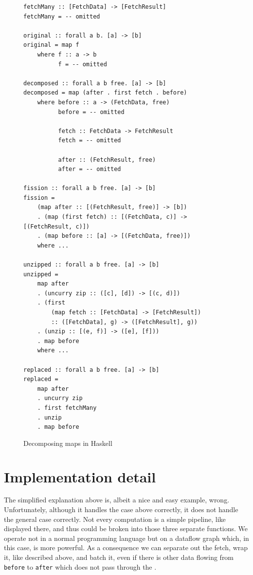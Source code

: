 \begin{figure}
\begin{verbatim}
fetchMany :: [FetchData] -> [FetchResult]
fetchMany = -- omitted

original :: forall a b. [a] -> [b]
original = map f
    where f :: a -> b
          f = -- omitted

decomposed :: forall a b free. [a] -> [b]
decomposed = map (after . first fetch . before)
    where before :: a -> (FetchData, free)
          before = -- omitted

          fetch :: FetchData -> FetchResult
          fetch = -- omitted

          after :: (FetchResult, free)
          after = -- omitted

fission :: forall a b free. [a] -> [b]
fission =
    (map after :: [(FetchResult, free)] -> [b])
    . (map (first fetch) :: [(FetchData, c)] -> [(FetchResult, c)])
    . (map before :: [a] -> [(FetchData, free)])
    where ...

unzipped :: forall a b free. [a] -> [b]
unzipped =
    map after
    . (uncurry zip :: ([c], [d]) -> [(c, d)])
    . (first
        (map fetch :: [FetchData] -> [FetchResult])
        :: ([FetchData], g) -> ([FetchResult], g))
    . (unzip :: [(e, f)] -> ([e], [f]))
    . map before
    where ...

replaced :: forall a b free. [a] -> [b]
replaced =
    map after
    . uncurry zip
    . first fetchMany
    . unzip
    . map before
\end{verbatim}
\caption{Decomposing maps in Haskell}
\label{fig:map-decomposition-in-code}
\end{figure}


\section{Implementation detail}

The simplified explanation above is, albeit a nice and easy example, wrong.
Unfortunately, although it handles the case above correctly, it does not handle the general case correctly.
Not every computation is a simple pipeline, like displayed there, and thus could be broken into those three separate functions.
We operate not in a normal programming language but on a dataflow graph which, in this case, is more powerful.
As a consequence we can separate out the fetch, wrap it, like described above, and batch it, even if there is other data flowing from \texttt{before} to \texttt{after} which does not pass through the \fetch{}.

